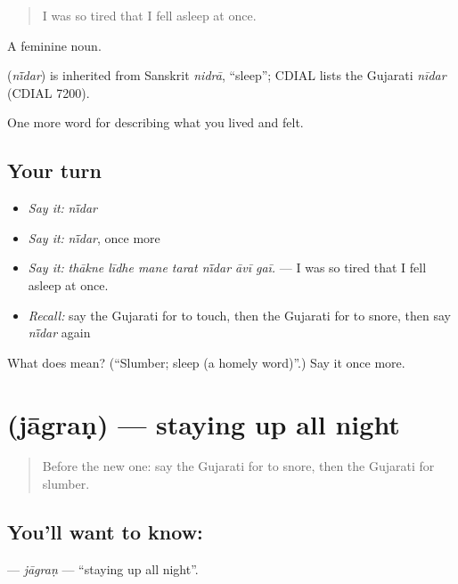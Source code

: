 \begin{quote}
I was so tired that I fell asleep at once.
\end{quote}

A feminine noun.

\begin{cousinweb}
\textbf{} (\emph{nī̃dar}) is inherited from Sanskrit \emph{nidrā}, \textquotedblleft{}sleep\textquotedblright{}; CDIAL lists the Gujarati \emph{nīdar} (CDIAL 7200).
\end{cousinweb}

\begin{grammarlens}[title={What you've built}]
One more word for describing what you lived and felt.
\end{grammarlens}

\subsection*{Your turn}
\begin{itemize}
\raggedright
  \item \emph{Say it:} \emph{nī̃dar}
  \item \emph{Say it:} \emph{nī̃dar}, once more
  \item \emph{Say it:} \emph{thākne līdhe mane tarat nī̃dar āvī gaī.} — I was so tired that I fell asleep at once.
  \item \emph{Recall:} say the Gujarati for to touch, then the Gujarati for to snore, then say \emph{nī̃dar} again
\end{itemize}

\begin{tcolorbox}[breakable,colback=teal!4,colframe=teal!35!black,title={Before you move on}]
What does  mean? (\textquotedblleft{}Slumber; sleep (a homely word)\textquotedblright{}.) Say it once more.
\end{tcolorbox}
\section[\texorpdfstring{\gu{જાગરણ} (jāgraṇ)}{જાગરણ (jāgraṇ)}]{ (jāgraṇ) — staying up all night}

\label{lesson:GU-C476-jagran}



\begin{quote}
Before the new one: say the Gujarati for to snore, then the Gujarati for slumber.
\end{quote}

\subsection*{You'll want to know: }
\textbf{} — \emph{jāgraṇ} — \textquotedblleft{}staying up all night\textquotedblright{}.

